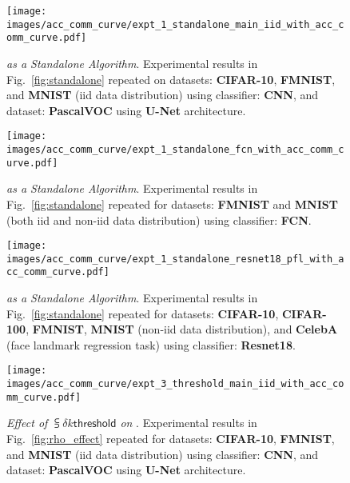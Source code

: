 \begin{figure}[t]
  \centering
    \centerline{\texttt{[image: images/acc\_comm\_curve/expt\_1\_standalone\_main\_iid\_with\_acc\_comm\_curve.pdf]}}
  \vspace{-1mm}
  \caption{\small{\textit{{\tt \algName} as a Standalone Algorithm}. Experimental results in Fig.~\ref{fig:standalone} repeated on datasets: \textbf{CIFAR-10}, \textbf{FMNIST}, and \textbf{MNIST} (iid data distribution) using classifier: \textbf{CNN}, and dataset: \textbf{PascalVOC} using \textbf{U-Net} architecture.}}
  \label{fig:standalone_cnn}
\end{figure}

\begin{figure}[t]
  \centering
  \centerline{\texttt{[image: images/acc\_comm\_curve/expt\_1\_standalone\_fcn\_with\_acc\_comm\_curve.pdf]}}
  \caption{\small{\textit{{\tt \algName} as a Standalone Algorithm}. Experimental results in Fig.~\ref{fig:standalone} repeated for datasets: \textbf{FMNIST} and \textbf{MNIST} (both iid and non-iid data distribution) using classifier: \textbf{FCN}.}}
  \label{fig:standalone_fcn}
\end{figure}

\begin{figure}[t]
  \centering
    \centerline{\texttt{[image: images/acc\_comm\_curve/expt\_1\_standalone\_resnet18\_pfl\_with\_acc\_comm\_curve.pdf]}}
  \caption{\small{\textit{{\tt \algName} as a Standalone Algorithm}. Experimental results in Fig.~\ref{fig:standalone} repeated for datasets: \textbf{CIFAR-10}, \textbf{CIFAR-100}, \textbf{FMNIST}, \textbf{MNIST} (non-iid data distribution), and \textbf{CelebA} (face landmark regression task) using classifier: \textbf{Resnet18}.}}
  \label{fig:standalone_resnet18}
\end{figure}


\begin{figure}[t]
  \centering
    \centerline{\texttt{[image: images/acc\_comm\_curve/expt\_3\_threshold\_main\_iid\_with\_acc\_comm\_curve.pdf]}}
  \vspace{-1mm}
  \caption{\small{\textit{Effect of $\subsup{\delta}{k}{\mathsf{threshold}}$ on {\algName}}. Experimental results in Fig.~\ref{fig:rho_effect} repeated for datasets: \textbf{CIFAR-10}, \textbf{FMNIST}, and \textbf{MNIST} (iid data distribution) using classifier: \textbf{CNN}, and dataset: \textbf{PascalVOC} using \textbf{U-Net} architecture.}}
  \label{fig:rho_effect_cnn}
\end{figure}

